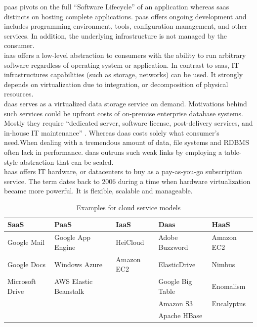 \ac{paas} pivots on the full \enquote{Software Lifecycle} of an application whereas \ac{saas} distincts on hosting complete applications. \ac{paas} offers ongoing development and includes programming environment, tools, configuration management, and other services. In addition, the underlying infrastructure is not managed by the consumer.\\

\ac{iaas} offers a low-level abstraction to consumers with the ability to run arbitrary software regardless of operating system or application. In contrast to \ac{saas}, IT infrastructures capabilities (such as storage, networks) can be used. It strongly depends on virtualization due to integration, or decomposition of physical resources. \\

\ac{daas} serves as a virtualized data storage service on demand. Motivations behind such services could be upfront costs of on-premise enterprise database systems.\cite{Dillon2010} Mostly they require \enquote{dedicated server, software license, post-delivery services, and in-house IT maintenance} \cite{Dillon2010}. Whereas \ac{daas} costs solely what consumer's need.When dealing with a tremendous amount of data, file systems and RDBMS often lack in performance. \ac{daas} outruns such weak links by employing a table-style abstraction that can be scaled.\cite{Dillon2010}\\

\ac{haas} offers IT hardware, or datacenters to buy as a pay-as-you-go subscription service. The term dates back to 2006 during a time when hardware virtualization became more powerful. It is flexible, scalable and manageable.\cite{Wang2010}\\

\begin{table}[h]
    \centering
    \caption{Examples for cloud service models}
    \begin{tabularx}{\linewidth}{X|X|X|X|X}
        SaaS            & PaaS                  & IaaS       & Daas             & HaaS       \\ \hline
        Google Mail     & Google App Engine     & HeiCloud   & Adobe Buzzword   & Amazon EC2 \\
        Google Docs     & Windows Azure         & Amazon EC2 & ElasticDrive     & Nimbus     \\
        Microsoft Drive & AWS Elastic Beanstalk &            & Google Big Table & Enomalism  \\
                        &                       &            & Amazon S3        & Eucalyptus \\
                        &                       &            & Apache HBase     &            \\
    \end{tabularx}
    \label{tab:example-service-models}
\end{table}

